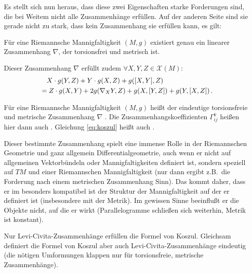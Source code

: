 \documentclass[../H_Analysis_main.tex]{subfiles}
\begin{document}
Es stellt sich nun heraus, dass diese zwei Eigenschaften starke Forderungen sind, die bei Weitem nicht alle Zusammenhänge erfüllen. Auf der anderen Seite sind sie gerade nicht zu stark, dass kein Zusammenhang sie erfüllen kann, es gilt:
\begin{satz}
Für eine Riemannsche Mannigfaltigkeit $(M, g)$ existiert genau ein linearer Zusammenhang $\nabla$, der torsionsfrei und metrisch ist.

Dieser Zusammenhang $\nabla$ erfüllt zudem $\forall X, Y, Z \in \mathcal{X}(M)$:
\begin{equation}\label{eq:koszul}
\begin{split}
& \quad X \cdot g(Y, Z) + Y \cdot g(X, Z) + g\qty([X, Y], Z) 
\\
&= Z \cdot g(X, Y) + 2 g\qty(\nabla_X Y, Z) + g\qty(X, [Y, Z]) + g\qty(Y, [X, Z]) \, .
\end{split}
\end{equation}
\end{satz}

\begin{defi}
Für eine Riemannsche Mannigfaltigkeit $(M, g)$ heißt der eindeutige torsionsfreie und metrische Zusammenhang $\nabla$ . Die Zusammenhangskoeffizienten $\Gamma_{ij}^k$ heißen hier dann auch . Gleichung \eqref{eq:koszul} heißt auch .
\end{defi}
Dieser bestimmte Zusammenhang spielt eine immense Rolle in der Riemannschen Geometrie und ganz allgemein Differentialgeometrie, auch wenn er nicht auf allgemeinen Vektorbündeln oder Mannigfaltigkeiten definiert ist, sondern speziell auf $TM$ und einer Riemannschen Mannigfaltigkeit (nur dann ergibt z.B.~die Forderung nach einem metrischen Zusammenhang Sinn). Das kommt daher, dass er im besonders kompatibel ist der Struktur der Mannigfaltigkeit auf der er definiert ist (insbesondere mit der Metrik). Im gewissen Sinne beeinflußt er die Objekte nicht, auf die er wirkt (Parallelogramme schließen sich weiterhin, Metrik ist konstant).

Nur Levi-Civita-Zusammenhänge erfüllen die Formel von Koszul. Gleichsam definiert die Formel von Koszul aber auch Levi-Civita-Zusammenhänge eindeutig (die nötigen Umformungen klappen nur für torsionsfreie, metrische Zusammenhänge).
\end{document}
